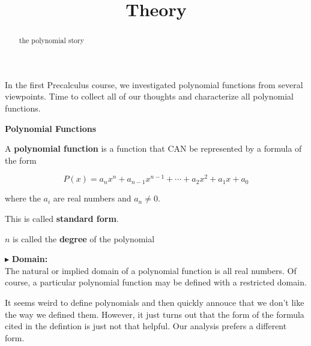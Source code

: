 \documentclass{ximera}
\title{Theory}
\begin{document}
\begin{abstract}
the polynomial story
\end{abstract}
\maketitle







In the first Precalculus course, we investigated polynomial functions from several viewpoints.  Time to collect all of our thoughts and characterize all polynomial functions.





\begin{definition} \textbf{\textcolor{green!50!black}{Polynomial Functions}} 


A \textbf{polynomial function} is a function that CAN be represented by a formula of the form


\[   P(x) = a_n x^n + a_{n-1} x^{n-1} + \cdots + a_2 x^2 + a_1 x + a_0        \]

where the $a_i$ are real numbers and $a_n \ne 0$.

This is called \textbf{standard form}.

$n$ is called the \textbf{degree} of the polynomial


\end{definition}



$\blacktriangleright$ \textbf{\textcolor{red!10!blue!90!}{Domain:}} \\ 
The natural or implied domain of a polynomial function is all real numbers.  Of course, a particular polynomial function may be defined with a restricted domain.



It seems weird to define polynomials and then quickly annouce that we don't like the way we defined them. However, it just turns out that the form of the formula cited in the defintion is just not that helpful.  Our analysis prefers a different form. \\
\end{document}
